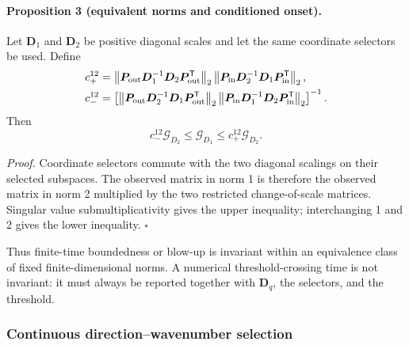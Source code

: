 \paragraph{Proposition 3 (equivalent norms and conditioned onset).}
Let $\boldsymbol D_1$ and $\boldsymbol D_2$ be positive diagonal scales and
let the same coordinate selectors be used.  Define
\begin{align}
 c_+^{12}
 &=\left\|\boldsymbol P_{\rm out}\boldsymbol D_1^{-1}
   \boldsymbol D_2\boldsymbol P_{\rm out}^{\mathsf T}\right\|_2
   \left\|\boldsymbol P_{\rm in}\boldsymbol D_2^{-1}
   \boldsymbol D_1\boldsymbol P_{\rm in}^{\mathsf T}\right\|_2,\\
 c_-^{12}
 &=\left[
   \left\|\boldsymbol P_{\rm out}\boldsymbol D_2^{-1}
   \boldsymbol D_1\boldsymbol P_{\rm out}^{\mathsf T}\right\|_2
   \left\|\boldsymbol P_{\rm in}\boldsymbol D_1^{-1}
   \boldsymbol D_2\boldsymbol P_{\rm in}^{\mathsf T}\right\|_2
   \right]^{-1}.
\end{align}
Then
\begin{equation}
 c_-^{12}\mathcal G_{D_2}
 \le \mathcal G_{D_1}
 \le c_+^{12}\mathcal G_{D_2}.
 \label{eq:dyn_norm_equivalence_bound}
\end{equation}

\emph{Proof.}
Coordinate selectors commute with the two diagonal scalings on their selected
subspaces.  The observed matrix in norm 1 is therefore the observed matrix in
norm 2 multiplied by the two restricted change-of-scale matrices.  Singular
value submultiplicativity gives the upper inequality; interchanging 1 and 2
gives the lower inequality. \hfill$\square$

Thus finite-time boundedness or blow-up is invariant within an equivalence
class of fixed finite-dimensional norms.  A numerical threshold-crossing time
is not invariant: it must always be reported together with
$\boldsymbol D_q$, the selectors, and the threshold.

\subsubsection{Continuous direction--wavenumber selection}

